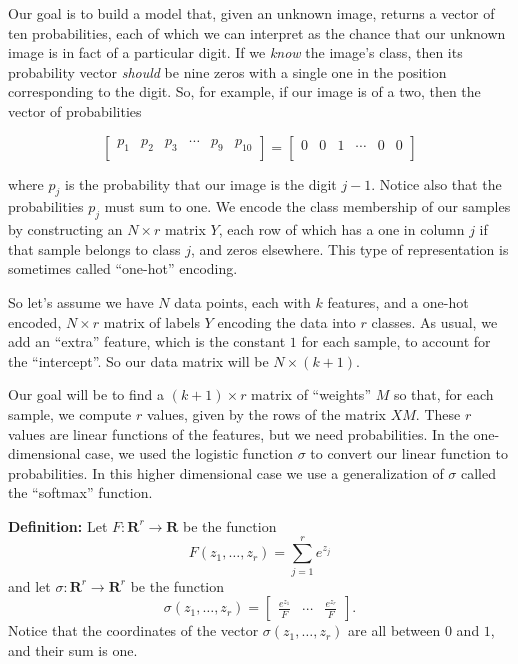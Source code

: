 \documentclass[
  11pt,
  letterpaper,
]{scrbook}
\theoremstyle{plain}
\theoremstyle{remark}
\begin{document}
Our goal is to build a model that, given an unknown image, returns a
vector of ten probabilities, each of which we can interpret as the
chance that our unknown image is in fact of a particular digit. If we
\emph{know} the image's class, then its probability vector \emph{should}
be nine zeros with a single one in the position corresponding to the
digit. So, for example, if our image is of a two, then the vector of
probabilities

\[
\left[ \begin{matrix} p_1 & p_2 & p_3 &\cdots & p_9 & p_{10}\\\end{matrix}\right]=\left[\begin{matrix} 0 &0 & 1 & \cdots & 0 & 0\\\end{matrix}\right]
\]

where \(p_j\) is the probability that our image is the digit \(j-1\).
Notice also that the probabilities \(p_j\) must sum to one. We encode
the class membership of our samples by constructing an \(N\times r\)
matrix \(Y\), each row of which has a one in column \(j\) if that sample
belongs to class \(j\), and zeros elsewhere. This type of representation
is sometimes called ``one-hot'' encoding.

So let's assume we have \(N\) data points, each with \(k\) features, and
a one-hot encoded, \(N\times r\) matrix of labels \(Y\) encoding the
data into \(r\) classes. As usual, we add an ``extra'' feature, which is
the constant \(1\) for each sample, to account for the ``intercept''. So
our data matrix will be \(N\times (k+1)\).

Our goal will be to find a \((k+1)\times r\) matrix of ``weights'' \(M\)
so that, for each sample, we compute \(r\) values, given by the rows of
the matrix \(XM\). These \(r\) values are linear functions of the
features, but we need probabilities. In the one-dimensional case, we
used the logistic function \(\sigma\) to convert our linear function to
probabilities. In this higher dimensional case we use a generalization
of \(\sigma\) called the ``softmax'' function.

\textbf{Definition:} Let \(F:\mathbf{R}^r\to\mathbf{R}\) be the function
\[
F(z_1,\ldots, z_r) = \sum_{j=1}^{r} e^{z_{j}}
\] and let \(\sigma:\mathbf{R}^{r}\to \mathbf{R}^{r}\) be the function
\[
\sigma(z_1,\ldots, z_r) = \left[\begin{matrix} \frac{e^{z_1}}{F} & \cdots & \frac{e^{z_{r}}}{F}\end{matrix}\right].
\] Notice that the coordinates of the vector \(\sigma(z_1,\ldots,z_r)\)
are all between \(0\) and \(1\), and their sum is one.
\end{document}
